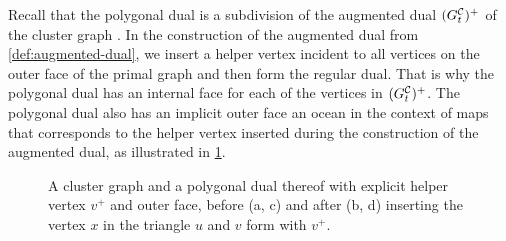 Recall that the polygonal dual is a subdivision of the augmented dual $(G^\mathcal{C}_{t})^+$ of the cluster graph .
In the construction of the augmented dual from \cref{def:augmented-dual}, we insert a helper vertex incident to all vertices on the outer face of the primal graph and then form the regular dual.
That is why the polygonal dual has an internal face for each of the vertices in $(G^\mathcal{C}_{t})^+$.
The polygonal dual also has an implicit outer face \emdash{} an ocean in the context of maps \emdash{} that corresponds to the helper vertex inserted during the construction of the augmented dual, as illustrated in \cref{fig:insert-vertex-duality}.

\begin{figure}[H]
	\centering
	\quad
	\qquad
	\quad
	\caption{A cluster graph and a polygonal dual thereof with explicit helper vertex $v^+$ and outer face, before (a, c) and after (b, d) inserting the vertex $x$ in the triangle $u$ and $v$ form with $v^+$.}
	\label{fig:insert-vertex-duality}
\end{figure}


